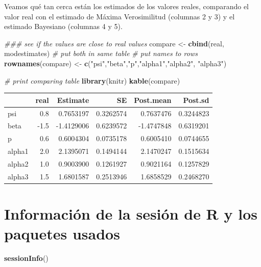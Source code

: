 \documentclass[
]{book}
\newenvironment{Shaded}{\begin{snugshade}}{\end{snugshade}}
\newcommand{\CommentTok}[1]{\textcolor[rgb]{0.56,0.35,0.01}{\textit{#1}}}
\newcommand{\KeywordTok}[1]{\textcolor[rgb]{0.13,0.29,0.53}{\textbf{#1}}}
\newcommand{\NormalTok}[1]{#1}
\newcommand{\StringTok}[1]{\textcolor[rgb]{0.31,0.60,0.02}{#1}}
\begin{document}
Veamos qué tan cerca están los estimados de los valores reales, comparando el valor real con el estimado de Máxima Verosimilitud (columnas 2 y 3) y el estimado Bayesiano (columnas 4 y 5).

\begin{Shaded}
\begin{Highlighting}[]
\CommentTok{### see if the values are close to real values}
\NormalTok{compare <-}\StringTok{ }\KeywordTok{cbind}\NormalTok{(real, modestimates) }\CommentTok{# put both in same table}
\CommentTok{# put names to rows}
\KeywordTok{rownames}\NormalTok{(compare) <-}\StringTok{ }\KeywordTok{c}\NormalTok{(}\StringTok{"psi"}\NormalTok{,}\StringTok{"beta"}\NormalTok{,}\StringTok{"p"}\NormalTok{,}\StringTok{"alpha1"}\NormalTok{,}\StringTok{"alpha2"}\NormalTok{, }\StringTok{"alpha3"}\NormalTok{)}

\CommentTok{# print comparing table}
\KeywordTok{library}\NormalTok{(knitr)}
\KeywordTok{kable}\NormalTok{(compare)}
\end{Highlighting}
\end{Shaded}

\begin{tabular}{l|r|r|r|r|r}
\hline
  & real & Estimate & SE & Post.mean & Post.sd\\
\hline
psi & 0.8 & 0.7653197 & 0.3262574 & 0.7637476 & 0.3244823\\
\hline
beta & -1.5 & -1.4129006 & 0.6239572 & -1.4747848 & 0.6319201\\
\hline
p & 0.6 & 0.6004304 & 0.0735178 & 0.6005410 & 0.0744655\\
\hline
alpha1 & 2.0 & 2.1395071 & 0.1494144 & 2.1470247 & 0.1515634\\
\hline
alpha2 & 1.0 & 0.9003900 & 0.1261927 & 0.9021164 & 0.1257829\\
\hline
alpha3 & 1.5 & 1.6801587 & 0.2513946 & 1.6858529 & 0.2468270\\
\hline
\end{tabular}

\hypertarget{informaciuxf3n-de-la-sesiuxf3n-de-r-y-los-paquetes-usados}{%
\chapter{Información de la sesión de R y los paquetes usados}\label{informaciuxf3n-de-la-sesiuxf3n-de-r-y-los-paquetes-usados}}

\begin{Shaded}
\begin{Highlighting}[]
\KeywordTok{sessionInfo}\NormalTok{()}
\end{Highlighting}
\end{Shaded}
\end{document}

